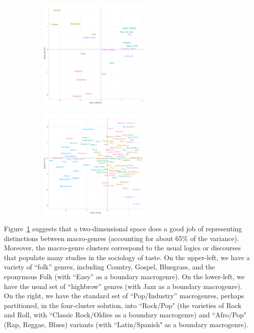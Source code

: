 \documentclass[a4paper,12pt]{extarticle}
\begin{document}
\begin{figure}[ht!]
     \begin{subfigure}[b]{1.0\textwidth}
        \centering
        \includegraphics[width=0.6\textwidth]{Figs/Link Clust/macro-pca-clust.png}
        \caption{}
        \label{fig:macro-pca}
    \end{subfigure} 
     \begin{subfigure}[b]{1.0\textwidth}
        \centering
        \includegraphics[width=0.6\textwidth]{Figs/Link Clust/micro-pca-clust.png}
        \caption{}
        \label{fig:micro-pca}
    \end{subfigure} 
    \caption{}
    \label{fig:macro-v-micro-pca}
 \end{figure}
 
 Figure~\ref{fig:macro-pca} suggests that a two-dimensional space does a good job of representing distinctions between macro-genres (accounting for about 65\% of the variance). Moreover, the macro-genre clusters correspond to the usual logics or discourses that populate many studies in the sociology of taste. On the upper-left, we have a variety of ``folk'' genres, including Country, Gospel, Bluegrass, and the eponymous Folk (with ``Easy'' as a boundary macrogenre). On the lower-left, we have the usual set of ``highbrow'' genres (with Jazz as a boundary macrogenre). On the right, we have the standard set of ``Pop/Industry'' macrogenres, perhaps partitioned, in the four-cluster solution, into ``Rock/Pop" (the varieties of Rock and Roll, with ``Classic Rock/Oldies as a boundary macrogenre) and ``Afro/Pop" (Rap, Reggae, Blues) variants (with ``Latin/Spanish" as a boundary macrogenre). 
 
\end{document}
